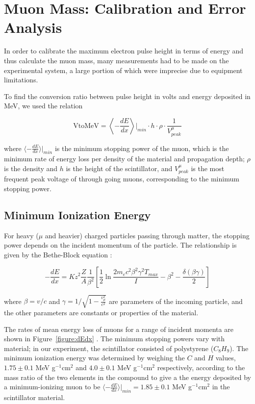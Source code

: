 
\section{Muon Mass: Calibration and Error Analysis}\label{masscalibration}

In order to calibrate the maximum electron pulse height in terms of
energy and thus calculate the muon mass, many measurements had to be
made on the experimental system, a large portion of which were
imprecise due to equipment limitations.

To find the conversion ratio between pulse height in volts and energy
deposited in MeV, we used the relation

\begin{equation} \mathrm{VtoMeV} = \left\langle -\frac{dE}{dx}\right\rangle\Big|_{min} \cdot h\cdot\rho\cdot\frac{1}{V_{peak}^{\mu}}\end{equation}   

where $\langle -\frac{dE}{dx}\rangle|_{min}$ is the minimum stopping
power of the muon, which is the minimum rate of energy loss per
density of the material and propagation depth; $\rho$ is the density
and $h$ is the height of the scintillator, and $V_{peak}^{\mu}$ is the
most frequent peak voltage of through going muons, corresponding to
the minimum stopping power.

\subsection{Minimum Ionization Energy}\label{minimumionizationenergy}

For heavy ($\mu$ and heavier) charged particles passing through
matter, the stopping power depends on the incident momentum of the
particle. The relationship is given by the Bethe-Block equation
\cite{yao}:

\begin{equation}
-\frac{dE}{dx} = Kz^2\frac{Z}{A}\frac{1}{\beta^2}\left[\frac{1}{2}\ln\frac{2m_ec^2\beta^2\gamma^2T_{max}}{I} - \beta^2 - \frac{\delta(\beta\gamma)}{2}\right]
\end{equation}

where $\beta = v/c$ and $\gamma = 1/\sqrt{1 - \frac{v_{\mu}^2}{c^2}}$
are parameters of the incoming particle, and the other parameters are
constants or properties of the material.

The rates of mean energy loss of muons for a range of incident momenta
are shown in Figure~\ref{figure:dEdx} \cite{yao}. The minimum stopping
powers vary with material; in our experiment, the scintillator
consisted of polystyrene ($C_8H_9$). The minimum ionization energy was
determined by weighing the $C$ and $H$ values, $1.75\pm 0.1$ MeV
g$^{-1}$cm$^{2}$ and $4.0\pm 0.1$ MeV g$^{-1}$cm$^{2}$ respectively,
according to the mass ratio of the two elements in the compound to
give a the energy deposited by a minimum-ionizing muon to be $\langle
-\frac{dE}{dx}\rangle|_{min}= 1.85 \pm 0.1$ MeV g$^{-1}$cm$^{2}$ in
the scintillator material.

